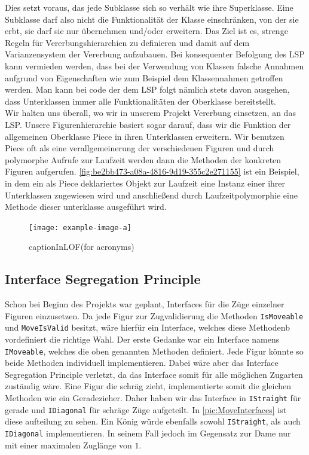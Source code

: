 \documentclass[
10pt, %
a4paper, %
oneside, %
headinclude,footinclude, %
BCOR5mm, %
]{scrartcl}
\begin{document}
\begin{onehalfspace}
Dies setzt voraus, das jede Subklasse sich so verhält wie ihre Superklasse. Eine Subklasse darf also nicht die Funktionalität der Klasse einschränken, von der sie erbt, sie darf sie nur übernehmen und/oder erweitern. Das Ziel ist es, strenge Regeln für Vererbungshierarchien zu definieren und damit auf dem Varianzensystem der Vererbung aufzubauen. Bei konsequenter Befolgung des LSP kann vermieden werden, dass bei der Verwendung von Klassen falsche Annahmen aufgrund von Eigenschaften wie zum Beispiel dem Klassennahmen getroffen werden. Man kann bei code der dem LSP folgt nämlich stets davon ausgehen, dass Unterklassen immer alle Funktionalitäten der Oberklasse bereitstellt.
\\
Wir halten uns überall, wo wir in unserem Projekt Vererbung einsetzen, an das LSP. Unsere Figurenhierarchie basiert sogar darauf, dass wir die Funktion der allgemeinen Oberklasse Piece in ihren Unterklassen erweitern. Wir benutzen Piece oft als eine verallgemeinerung der verschiedenen Figuren und durch polymorphe Aufrufe zur Laufzeit werden dann die Methoden der konkreten Figuren aufgerufen. \autoref{fig:be2bb473-a08a-4816-9d19-355c2e271155} ist ein Beispiel, in dem ein als Piece deklariertes Objekt zur Laufzeit eine Instanz einer ihrer Unterklassen zugewiesen wird und anschließend durch Laufzeitpolymorphie eine Methode dieser unterklasse ausgeführt wird.

\begin{figure}[ht]
	\texttt{[image: example-image-a]}
	\caption[captionInLOF(for acronyms)]{captionInLOF(for acronyms)}
	\label{fig:be2bb473-a08a-4816-9d19-355c2e271155}
\end{figure}

\subsection{Interface Segregation Principle}
Schon bei Beginn des Projekts war geplant, Interfaces für die Züge einzelner Figuren einzusetzen. Da jede Figur zur Zugvalidierung die Methoden \texttt{IsMoveable} und \texttt{MoveIsValid} besitzt, wäre hierfür ein Interface, welches diese Methodenb vordefiniert die richtige Wahl. Der erste Gedanke war ein Interface namens \texttt{IMoveable}, welches die oben genannten Methoden definiert. Jede Figur könnte so beide Methoden individuell implementieren. Dabei wäre aber das Interface Segregation Principle verletzt, da das Interface somit für alle möglichen Zugarten zuständig wäre. Eine Figur die schräg zieht, implementierte somit die gleichen Methoden wie ein Geradezieher. Daher haben wir das Interface in \texttt{IStraight} für gerade und \texttt{IDiagonal} für schräge Züge aufgeteilt. In \autoref{pic:MoveInterfaces} ist diese aufteilung zu sehen. Ein König würde ebenfalls sowohl \texttt{IStraight}, als auch \texttt{IDiagonal} implementieren. In seinem Fall jedoch im Gegensatz zur Dame nur mit einer maximalen Zuglänge von $1$.


\end{onehalfspace}
\end{document}
